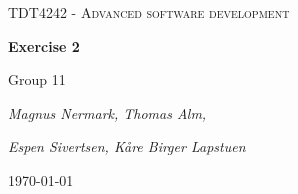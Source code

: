\documentclass{article}
\begin{document}
\begin{titlepage}
	\centering
	{\scshape\huge TDT4242 - Advanced software development\par}
	\vspace{1.5cm}
	{\huge\bfseries Exercise 2\par}
	\vspace{2cm}
	{\Large Group 11\par}
	{\Large\itshape Magnus Nermark, Thomas Alm,\par}
	{\Large\itshape Espen Sivertsen, Kåre Birger Lapstuen\par}


	\vfill
	


	{\large \today\par}
\end{titlepage}
\tableofcontents
\newpage


%
%
\end{document}
